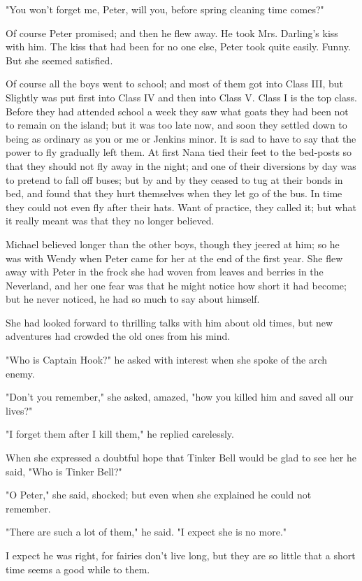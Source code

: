 "You won't forget me, Peter, will you, before spring cleaning time comes?"


Of course Peter promised; and then he flew away. He took Mrs. Darling's
kiss with him. The kiss that had been for no one else, Peter took quite
easily. Funny. But she seemed satisfied.


Of course all the boys went to school; and most of them got into Class
III, but Slightly was put first into Class IV and then into Class V. Class
I is the top class. Before they had attended school a week they saw what
goats they had been not to remain on the island; but it was too late now,
and soon they settled down to being as ordinary as you or me or Jenkins
minor. It is sad to have to say that the power to
fly gradually left them. At first Nana tied their feet to the bed-posts so
that they should not fly away in the night; and one of their diversions by
day was to pretend to fall off buses; but by
and by they ceased to tug at their bonds in bed, and found that they hurt
themselves when they let go of the bus. In time they could not even fly
after their hats. Want of practice, they called it; but what it really
meant was that they no longer believed.


Michael believed longer than the other boys, though they jeered at him; so
he was with Wendy when Peter came for her at the end of the first year.
She flew away with Peter in the frock she had woven from leaves and
berries in the Neverland, and her one fear was that he might notice how
short it had become; but he never noticed, he had so much to say about
himself.


She had looked forward to thrilling talks with him about old times, but
new adventures had crowded the old ones from his mind.


"Who is Captain Hook?" he asked with interest when she spoke of the arch
enemy.


"Don't you remember," she asked, amazed, "how you killed him and saved all
our lives?"


"I forget them after I kill them," he replied carelessly.


When she expressed a doubtful hope that Tinker Bell would be glad to see
her he said, "Who is Tinker Bell?"


"O Peter," she said, shocked; but even when she explained he could not
remember.


"There are such a lot of them," he said. "I expect she is no more."


I expect he was right, for fairies don't live long, but they are so little
that a short time seems a good while to them.


